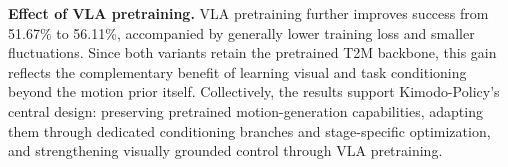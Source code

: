 \textbf{Effect of VLA pretraining.} VLA pretraining further improves success from 51.67\% to 56.11\%, accompanied by generally lower training loss and smaller fluctuations. Since both variants retain the pretrained T2M backbone, this gain reflects the complementary benefit of learning visual and task conditioning beyond the motion prior itself. Collectively, the results support Kimodo-Policy's central design: preserving pretrained motion-generation capabilities, adapting them through dedicated conditioning branches and stage-specific optimization, and strengthening visually grounded control through VLA pretraining.


\endgroup
